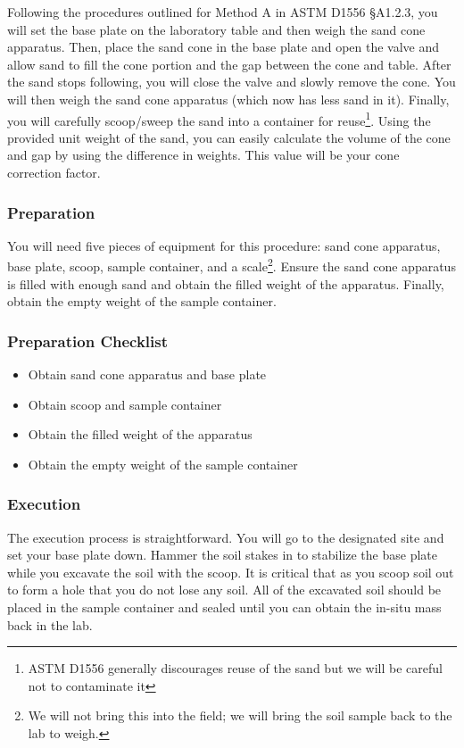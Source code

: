 \documentclass[12pt]{article}
\begin{document}
Following the procedures outlined for Method A in ASTM D1556 \S A1.2.3, you will set the base plate on the laboratory table and then weigh the sand cone apparatus. Then, place the sand cone in the base plate and open the valve and allow sand to fill the cone portion and the gap between the cone and table. After the sand stops following, you will close the valve and slowly remove the cone. You will then weigh the sand cone apparatus (which now has less sand in it). Finally, you will carefully scoop/sweep the sand into a container for reuse\footnote{ASTM D1556 generally discourages reuse of the sand but we will be careful not to contaminate it}. Using the provided unit weight of the sand, you can easily calculate the volume of the cone and gap by using the difference in weights. This value will be your cone correction factor.

\subsubsection{Preparation}
You will need five pieces of equipment for this procedure: sand cone apparatus, base plate, scoop, sample container, and a scale\footnote{We will not bring this into the field; we will bring the soil sample back to the lab to weigh.}. Ensure the sand cone apparatus is filled with enough sand and obtain the filled weight of the apparatus. Finally, obtain the empty weight of the sample container.

\subsubsection*{Preparation Checklist}
\begin{itemize}
    \item Obtain sand cone apparatus and base plate
    \item Obtain scoop and sample container
    \item Obtain the filled weight of the apparatus
    \item Obtain the empty weight of the sample container
\end{itemize}

\subsubsection{Execution}
The execution process is straightforward. You will go to the designated site and set your base plate down. Hammer the soil stakes in to stabilize the base plate while you excavate the soil with the scoop. It is critical that as you scoop soil out to form a hole that you do not lose any soil. All of the excavated soil should be placed in the sample container and sealed until you can obtain the in-situ mass back in the lab.
\end{document}
